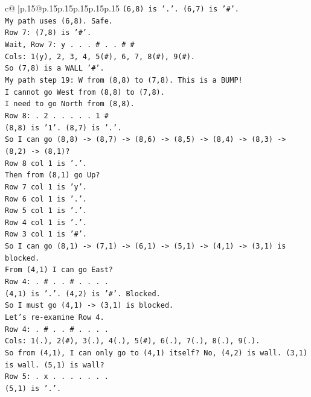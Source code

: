 \documentclass{article}
\begin{document}
{\begin{supertabular}{c@{$\;$}|p{.15\linewidth}@{}p{.15\linewidth}p{.15\linewidth}p{.15\linewidth}p{.15\linewidth}p{.15\linewidth}}
{{{\texttt{(6,8) is '.'. (6,7) is '\#'.} \\
\texttt{My path uses (6,8). Safe.} \\
\texttt{Row 7: (7,8) is '\#'.} \\
\texttt{Wait, Row 7: y . . . \# . . \# \#} \\
\texttt{Cols: 1(y), 2, 3, 4, 5(\#), 6, 7, 8(\#), 9(\#).} \\
\texttt{So (7,8) is a WALL '\#'.} \\
\texttt{My path step 19: W from (8,8) to (7,8). This is a BUMP!} \\
\texttt{I cannot go West from (8,8) to (7,8).} \\
\texttt{I need to go North from (8,8).} \\
\texttt{Row 8: . 2 . . . . . 1 \#} \\
\texttt{(8,8) is '1'. (8,7) is '.'.} \\
\texttt{So I can go (8,8) {-}> (8,7) {-}> (8,6) {-}> (8,5) {-}> (8,4) {-}> (8,3) {-}> (8,2) {-}> (8,1)?} \\
\texttt{Row 8 col 1 is '.'.} \\
\texttt{Then from (8,1) go Up?} \\
\texttt{Row 7 col 1 is 'y'.} \\
\texttt{Row 6 col 1 is '.'.} \\
\texttt{Row 5 col 1 is '.'.} \\
\texttt{Row 4 col 1 is '.'.} \\
\texttt{Row 3 col 1 is '\#'.} \\
\texttt{So I can go (8,1) {-}> (7,1) {-}> (6,1) {-}> (5,1) {-}> (4,1) {-}> (3,1) is blocked.} \\
\texttt{From (4,1) I can go East?} \\
\texttt{Row 4: . \# . . \# . . . .} \\
\texttt{(4,1) is '.'. (4,2) is '\#'. Blocked.} \\
\texttt{So I must go (4,1) {-}> (3,1) is blocked.} \\
\texttt{Let's re{-}examine Row 4.} \\
\texttt{Row 4: . \# . . \# . . . .} \\
\texttt{Cols: 1(.), 2(\#), 3(.), 4(.), 5(\#), 6(.), 7(.), 8(.), 9(.).} \\
\texttt{So from (4,1), I can only go to (4,1) itself? No, (4,2) is wall. (3,1) is wall. (5,1) is wall?} \\
\texttt{Row 5: . x . . . . . . .} \\
\texttt{(5,1) is '.'.} \\
}}}
\end{supertabular}}
\end{document}
